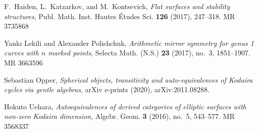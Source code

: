\documentclass[a0,landscape]{a0poster}
\providecommand{\MR}{\relax\ifhmode\unskip\space\fi MR }
\theoremstyle{plain}
\theoremstyle{definition}
\begin{document}
\begin{multicols}{3}
    \vspace*{-1cm}

    \begin{thebibliography}{99}
        {
        \small
        F.~Haiden, L.~Katzarkov, and M.~Kontsevich, \emph{Flat surfaces and stability structures}, Publ. Math. Inst. Hautes \'{E}tudes Sci. \textbf{126} (2017), 247--318. \MR {3735868}

        Yank{\i} Lekili and Alexander Polishchuk, \emph{Arithmetic mirror symmetry for genus 1 curves with {$n$} marked points}, Selecta Math. (N.S.) \textbf{23} (2017), no.~3, 1851--1907. \MR{3663596}

        Sebastian {Opper}, \emph{{Spherical objects, transitivity and auto-equivalences of Kodaira cycles via gentle algebras}}, arXiv e-prints (2020), arXiv:2011.08288.

        Hokuto Uehara, \emph{Autoequivalences of derived categories of elliptic surfaces with non-zero {K}odaira dimension}, Algebr. Geom. \textbf{3} (2016), no.~5, 543--577. \MR{3568337}
        }
    \end{thebibliography}



\end{multicols}
\end{document}

